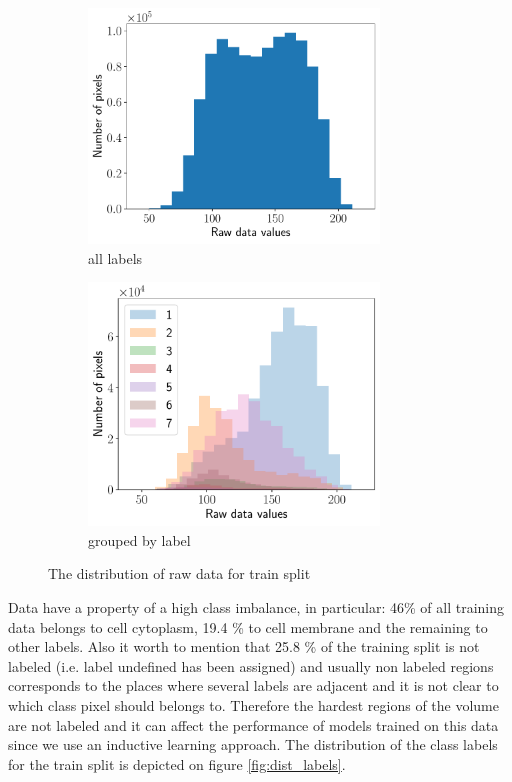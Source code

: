 \documentclass[twocolumn, a4paper]{article}
\theoremstyle{definition}
\begin{document}
\begin{figure}[t]
    \begin{subfigure}{0.49 \textwidth}
        \centering
        \includegraphics[width=0.85\textwidth]{raw_data_dist.pdf}
        \caption{all labels}
    \end{subfigure}
    \begin{subfigure}{0.49 \textwidth}
        \centering
        \includegraphics[width=0.85\textwidth]{raw_data_dist_per_label.pdf}
        \caption{grouped by label}
    \end{subfigure}
    \caption{The distribution of raw data for train split}
    \label{fig:dist_raw_train}
\end{figure}

Data have a property of a high class imbalance, in particular: 46\% of all training data belongs to
cell cytoplasm, 19.4 \% to cell membrane and the remaining to other labels.
Also it worth to mention that 25.8 \% of the training split is not labeled
(i.e. label undefined has been assigned) and usually non labeled regions corresponds to
the places where several labels are adjacent and it is not clear to which class pixel should belongs to.
Therefore the hardest regions of the volume are not labeled and it can affect the performance of models
trained on this data since we use an inductive learning approach.
The distribution of the class labels for the train split is depicted on figure \ref{fig:dist_labels}.
\end{document}
